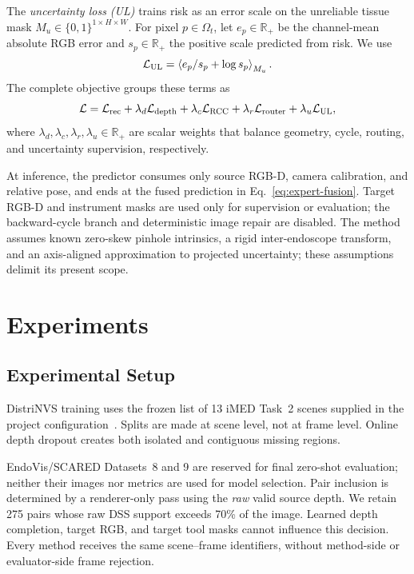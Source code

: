 \documentclass[letterpaper,10pt,conference]{ieeeconf}
\newcommand{\R}{\mathbb{R}}
\begin{document}
The \emph{uncertainty loss (UL)} trains risk as an error scale on the
unreliable tissue mask $M_u\in\{0,1\}^{1\times H\times W}$. For pixel
$p\in\Omega_t$, let $e_p\in\R_+$ be the channel-mean absolute RGB error and
$s_p\in\R_+$ the positive scale predicted from risk. We use
\begin{equation}
 \mathcal L_{\rm UL}
 =\left\langle e_p/s_p+\log s_p\right\rangle_{M_u}.
\label{eq:risk-loss}
\end{equation}
The complete objective groups these terms as
\begin{equation}
 \mathcal L=\mathcal L_{\rm rec}+\lambda_d\mathcal L_{\rm depth}
 +\lambda_c\mathcal L_{\rm RCC}+\lambda_r\mathcal L_{\rm router}
 +\lambda_u\mathcal L_{\rm UL},
\label{eq:total-loss}
\end{equation}
where $\lambda_d,\lambda_c,\lambda_r,\lambda_u\in\R_+$ are scalar weights that
balance geometry, cycle, routing, and uncertainty supervision, respectively.

At inference, the predictor consumes only source RGB-D, camera calibration,
and relative pose, and ends at the fused prediction in
Eq.~\eqref{eq:expert-fusion}. Target RGB-D and instrument masks are used only
for supervision or evaluation; the backward-cycle branch and deterministic
image repair are disabled. The method assumes known
zero-skew pinhole intrinsics, a rigid inter-endoscope transform, and an
axis-aligned approximation to projected uncertainty; these assumptions delimit
its present scope.

\section{Experiments}
\label{sec:experiments}

\subsection{Experimental Setup}
\label{sec:implementation}

DistriNVS training uses the frozen list of 13 iMED Task~2 scenes supplied in
the project configuration~\cite{imed2026}. Splits are made at scene level, not
at frame level. Online depth dropout creates both isolated and contiguous
missing regions.

EndoVis/SCARED Datasets~8 and 9 are reserved for final zero-shot evaluation;
neither their images nor metrics are used for model selection. Pair inclusion
is determined by a renderer-only pass using the \emph{raw} valid source depth.
We retain 275 pairs whose raw DSS support exceeds 70\% of the image. Learned
depth completion, target RGB, and target tool masks cannot influence this
decision. Every method receives the same scene--frame identifiers, without
method-side or evaluator-side frame rejection.
\end{document}
